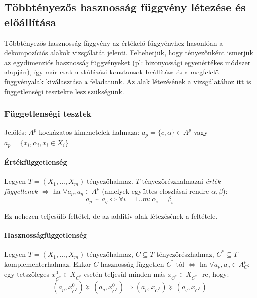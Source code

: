 \documentclass[a4paper,12pt]{article}
\begin{document}
\subsection{Többtényezős hasznosság függvény létezése és előállítása}

Többtényezős hasznosság függvény az értékelő függvényhez hasonlóan a dekompozíciós alakok vizsgálatát jelenti. Feltehetjük, hogy tényezőnként ismerjük az egydimenziós hasznosság függvényeket (pl: bizonyossági egyenértékes módszer alapján), így már csak a skálázási konstansok beállítása és a megfelelő függvényalak kiválasztása a feladatunk. Az alak létezésének a vizsgálatához itt is függetlenségi tesztekre lesz szükségünk.

\subsubsection{Függetlenségi tesztek}

Jelölés: $A^p$ kockázatos kimenetelek halmaza:  $a_p=\{c, \alpha\} \in A^p  $ vagy $a_{p} = \{x_i, \alpha_i, x_i \in X_i\}$

\paragraph{Értékfüggetlenség}

Legyen $T=(X_1,...,X_m)$ tényezőhalmaz. $T$ tényezőrészhalmazai \textit{érték-függetlenek} $\Leftrightarrow$ ha $\forall a_p, a_q \in A^p$ (amelyek együttes eloszlásai rendre $\alpha,\beta$): 
\begin{equation}
 a_p \sim a_q \Leftrightarrow \forall i=1..m: \alpha_i=\beta_i
\end{equation}

Ez nehezen teljesülő feltétel, de az additív alak létezésének a feltétele.

\paragraph{Hasznosságfüggetlenség}

Legyen $T=(X_1,...,X_m)$ tényezőhalmaz, $C \subseteq T$ tényezőrészhalmaz,  $C^* \subseteq T $ komplementerhalmaz. Ekkor $C$ hasznosság független $C^*$-tól $\Leftrightarrow$ ha $\forall a_{p}, a_q \in A^p_C:$  egy tetszőleges $x_{C^{*}}^0 \in X_{C^*}$  esetén teljesül minden más $ x_{C^{*}} \in X_{C^*}$ -re, hogy:
\begin{equation}
(a_p, x_{C^{*}}^0) \succeq (a_q, x_{C^{*}}^0) 
\Rightarrow
(a_p, x_{C^{*}}) \succeq (a_q, x_{C^{*}}) 
\end{equation}
\end{document}
